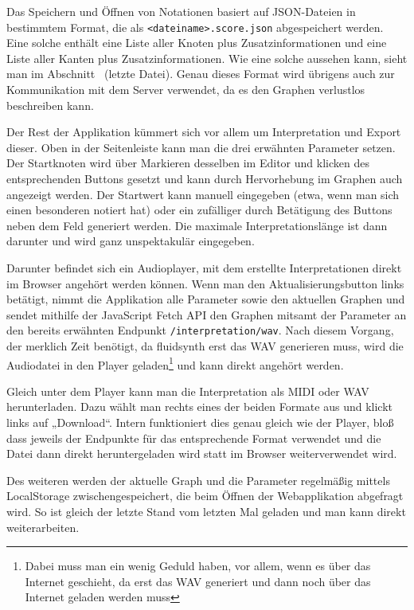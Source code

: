 \documentclass[a4paper,twocolumn]{article}
\begin{document}
Das Speichern und Öffnen von Notationen basiert auf JSON-Dateien
\cite{json} in bestimmtem Format, die als
\lstinline|<dateiname>.score.json| abgespeichert werden.
Eine solche enthält eine Liste aller Knoten plus Zusatzinformationen und eine
Liste aller Kanten plus Zusatzinformationen. Wie eine solche aussehen kann,
sieht man im Abschnitt~ (letzte Datei). Genau dieses Format
wird übrigens auch zur Kommunikation mit dem Server verwendet, da es den Graphen
verlustlos beschreiben kann.

Der Rest der Applikation kümmert sich vor allem um Interpretation und Export
dieser. Oben in der Seitenleiste kann man die drei erwähnten Parameter setzen.
Der Startknoten wird über Markieren desselben im Editor und klicken des
entsprechenden Buttons gesetzt und kann durch Hervorhebung im Graphen auch
angezeigt werden. Der Startwert kann manuell eingegeben (etwa, wenn man
sich einen besonderen notiert hat) oder ein zufälliger durch Betätigung des
Buttons neben dem Feld generiert werden. Die maximale Interpretationslänge ist
dann darunter und wird ganz unspektakulär eingegeben.

Darunter befindet sich ein Audioplayer, mit dem erstellte Interpretationen
direkt im Browser angehört werden können. Wenn man den Aktualisierungsbutton
links betätigt, nimmt die Applikation alle Parameter sowie den aktuellen Graphen
und sendet mithilfe der JavaScript Fetch API \cite{fetch_api} den Graphen
mitsamt der Parameter an den bereits erwähnten Endpunkt
\lstinline|/interpretation/wav|. Nach diesem Vorgang, der merklich Zeit benötigt,
da fluidsynth \cite{fluidsynth} erst das WAV generieren muss, wird die
Audiodatei in den Player geladen\footnote{Dabei muss man ein wenig Geduld haben,
vor allem, wenn es über das Internet geschieht, da erst das WAV generiert und
dann noch über das Internet geladen werden muss} und kann direkt angehört werden.

Gleich unter dem Player kann man die Interpretation als MIDI oder WAV
herunterladen. Dazu wählt man rechts eines der beiden Formate aus und klickt
links auf „Download“. Intern funktioniert dies genau gleich wie der Player, bloß
dass jeweils der Endpunkte für das entsprechende Format verwendet und
die Datei dann direkt heruntergeladen wird statt im Browser weiterverwendet
wird.

Des weiteren werden der aktuelle Graph und die Parameter regelmäßig mittels
LocalStorage \cite{localstorage} zwischengespeichert, die beim Öffnen der
Webapplikation abgefragt wird. So ist gleich der letzte Stand vom letzten Mal
geladen und man kann direkt weiterarbeiten.
\end{document}
